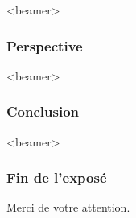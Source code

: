 \begin{frame}<beamer>
  \frametitle{Perspective}
\end{frame}
\begin{frame}<beamer>
\frametitle{Conclusion}
\end{frame}
\begin{frame}<beamer>\frametitle{Fin de l'exposé}
\begin{center}
Merci de votre attention.
\end{center}
\end{frame}